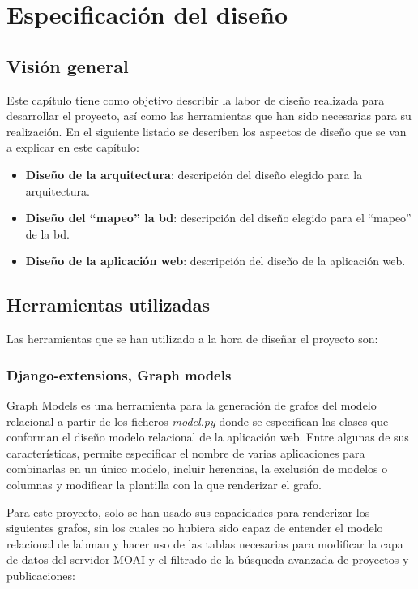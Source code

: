 \chapter{Especificación del diseño}\label{chap:design}

\section{Visión general}

Este capítulo tiene como objetivo describir la labor de diseño realizada para desarrollar el proyecto, así como las herramientas que han sido necesarias para su realización. En el siguiente listado se describen los aspectos de diseño que se van a explicar en este capítulo:

\begin{itemize}
	\item \textbf{Diseño de la arquitectura}: descripción del diseño elegido para la arquitectura.
	\item \textbf{Diseño del ``mapeo'' la \acrlong{bd}}: descripción del diseño elegido para el ``mapeo'' de la \acrshort{bd}.
	\item \textbf{Diseño de la aplicación web}: descripción del diseño de la aplicación web.

\end{itemize}

\section{Herramientas utilizadas}

Las herramientas que se han utilizado a la hora de diseñar el proyecto son:

\subsection{Django-extensions, Graph models}

Graph Models es una herramienta para la generación de grafos del modelo relacional a partir de los ficheros \textit{model.py} donde se especifican las clases que conforman el diseño modelo relacional de la aplicación web. Entre algunas de sus características, permite especificar el nombre de varias aplicaciones para combinarlas en un único modelo, incluir herencias, la exclusión de modelos o columnas y modificar la plantilla con la que renderizar el grafo.

Para este proyecto, solo se han usado sus capacidades para renderizar los siguientes grafos, sin los cuales no hubiera sido capaz de entender el modelo relacional de \acrshort{labman} y hacer uso de las tablas necesarias para modificar la capa de datos del servidor MOAI y el filtrado de la búsqueda avanzada de proyectos y publicaciones:

